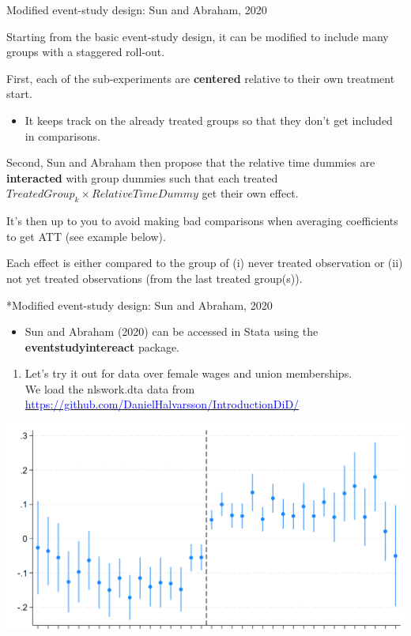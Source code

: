 \documentclass[notes,11pt, aspectratio=169]{beamer}
\newenvironment{wideitemize}{\itemize\addtolength{\itemsep}{10pt}}{\enditemize}
\begin{document}
\begin{frame}{Modified event-study design: Sun and Abraham, 2020}
\begin{wideitemize}
    \item Starting from the basic event-study design, it can be modified to include many groups with a staggered roll-out.
    \item First, each of the sub-experiments are \textbf{centered} relative to their own treatment start.
    
    \begin{itemize}
        \item It keeps track on the already treated groups so that they don't get included in comparisons.
    \end{itemize}
    
    \item Second, Sun and Abraham then propose that the relative time dummies are \textbf{interacted} with group dummies such that each treated $TreatedGroup_k\times RelativeTimeDummy$ get their own effect. 
    
    \item It's then up to you to avoid making bad comparisons when averaging coefficients to get ATT (see example below).

    \item Each effect is either compared to the group of (i) never treated observation or (ii) not yet treated observations (from the last treated group(s)).
\end{wideitemize}
\end{frame}

\begin{frame}{*Modified event-study design: Sun and Abraham, 2020}
\begin{itemize}
    \item Sun and Abraham (2020) can be accessed in Stata using the \textbf{eventstudyintereact} package.
\end{itemize}
\begin{enumerate}
    \item Let's try it out for data over female wages and union memberships.\\
  We load the nlswork.dta data from  \href{https://github.com/DanielHalvarsson/IntroductionDiD/}{\textcolor{blue}{https://github.com/DanielHalvarsson/IntroductionDiD/}}
\end{enumerate}
\vspace{0.5cm}
    \begin{center}
        \includegraphics[width=0.6\linewidth]{24_DiDLecture/24_DiDLecture_SunAndAbraham.png}
    \end{center} 
\end{frame}
\end{document}
